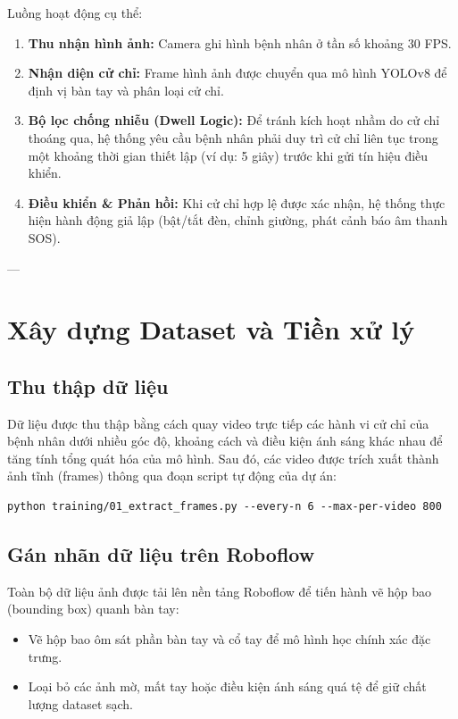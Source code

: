 \documentclass[12pt,a4paper]{article}
\begin{document}
Luồng hoạt động cụ thể:
\begin{enumerate}
    \item \textbf{Thu nhận hình ảnh:} Camera ghi hình bệnh nhân ở tần số khoảng 30 FPS.
    \item \textbf{Nhận diện cử chỉ:} Frame hình ảnh được chuyển qua mô hình YOLOv8 để định vị bàn tay và phân loại cử chỉ.
    \item \textbf{Bộ lọc chống nhiễu (Dwell Logic):} Để tránh kích hoạt nhầm do cử chỉ thoáng qua, hệ thống yêu cầu bệnh nhân phải duy trì cử chỉ liên tục trong một khoảng thời gian thiết lập (ví dụ: 5 giây) trước khi gửi tín hiệu điều khiển.
    \item \textbf{Điều khiển & Phản hồi:} Khi cử chỉ hợp lệ được xác nhận, hệ thống thực hiện hành động giả lập (bật/tắt đèn, chỉnh giường, phát cảnh báo âm thanh SOS).
\end{enumerate}

---

\section{Xây dựng Dataset và Tiền xử lý}
\subsection{Thu thập dữ liệu}
Dữ liệu được thu thập bằng cách quay video trực tiếp các hành vi cử chỉ của bệnh nhân dưới nhiều góc độ, khoảng cách và điều kiện ánh sáng khác nhau để tăng tính tổng quát hóa của mô hình. 
Sau đó, các video được trích xuất thành ảnh tĩnh (frames) thông qua đoạn script tự động của dự án:
\begin{lstlisting}[caption={Script trích xuất frame từ video raw}]
python training/01_extract_frames.py --every-n 6 --max-per-video 800
\end{lstlisting}

\subsection{Gán nhãn dữ liệu trên Roboflow}
Toàn bộ dữ liệu ảnh được tải lên nền tảng Roboflow để tiến hành vẽ hộp bao (bounding box) quanh bàn tay:
\begin{itemize}
    \item Vẽ hộp bao ôm sát phần bàn tay và cổ tay để mô hình học chính xác đặc trưng.
    \item Loại bỏ các ảnh mờ, mất tay hoặc điều kiện ánh sáng quá tệ để giữ chất lượng dataset sạch.
\end{itemize}
\end{document}
